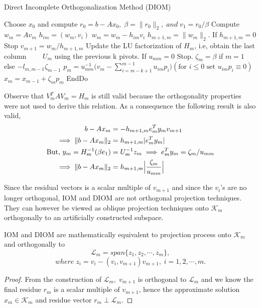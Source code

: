 \documentclass[10pt,a4paper]{article}
\begin{document}
\begin{algorithm}
\caption{Direct Incomplete Orthogonalization Method (DIOM)}
\begin{algorithmic}[1]
\State Choose $x_0$ and compute $r_0=b-Ax_0,\;\beta=\|r_0\|_2,\;and\;v_1=r_0/\beta$
	\State Compute $w_m = Av_m$
		\State $h_{im} = (w_m,v_i)$
		\State $w_m = w_m - h_{im}v_i$
	\EndFor
	\State $h_{m+1,m} = \|w_m\|_2$. If $h_{m+1,m}=0$ Stop
	\State $v_{m+1}=w_m/h_{m+1,m}$
	\State Update the LU factorization of $H_m$, i.e, obtain the last column 	
	\State $\qquad U_m$ using the previous k pivots. If $u_{mm}=0$ Stop.
	\State $\zeta_m = \beta$ if $m=1$ else $-l_{m,m-1}\zeta_{m-1}$
	\State $p_m = u^{-1}_{mm}\Big( v_m-\sum^{m-1}_{i=m-k+1}u_{im}p_i \Big)(\text{for }i\le0\text{ set }u_{im}p_i\equiv0)$
	\State $x_m=x_{m-1}+\zeta_mp_m$
\EndFor
\State EndDo
\end{algorithmic}
\end{algorithm}

\begin{remark}
Observe that $V^T_mAV_m=H_m$ is still valid because the orthogonality properties were not used to derive this relation. As a consequence the following result  is also valid,
\begin{align*}
b-Ax_m &= -h_{m+1,m}e^T_my_mv_{m+1} \\
\implies \|b-Ax_m\|_2 &= h_{m+1,m}|e^T_my_m| \\
\text{But, }y_m = H^{-1}_m(\beta	e_1) &= U^{-1}_mz_m \implies e^T_my_m = \zeta_m/u_{mm} \\
\implies \|b-Ax_m\|_2 &= h_{m+1,m}\Bigl|\frac{\zeta_m}{u_{mm}}\Bigr|
\end{align*}
\end{remark}

Since the residual vectors is a scalar multiple of $v_{m+1}$ and since the $v_i$'s are no longer orthogonal, IOM and DIOM are not orthogonal projection techniques. They can however be viewed as oblique projection techniques onto $\mathcal{K}_m$ orthogonally to an artificially constructed subspace.

\begin{prop}
IOM and DIOM are mathematically equivalent to projection process onto $\mathcal{K}_m$ and orthogonally to
$$\mathcal{L}_m=span\{z_1,z_2,\cdots,z_m\},$$
$$where\;z_i=v_i-(v_i,v_{m+1})v_{m+1},\;i=1,2,\cdots,m.$$
\end{prop}

\begin{proof}
From the construction of $\mathcal{L}_m,\;v_{m+1}$ is orthogonal to $\mathcal{L}_m$ and we know the final residue $r_m$ is a scalar multiple of $v_{m+1}$, hence the approximate solution $x_m\in\mathcal{K}_m$ and residue vector $r_m\perp\mathcal{L}_m$.  
\end{proof}
\end{document}
